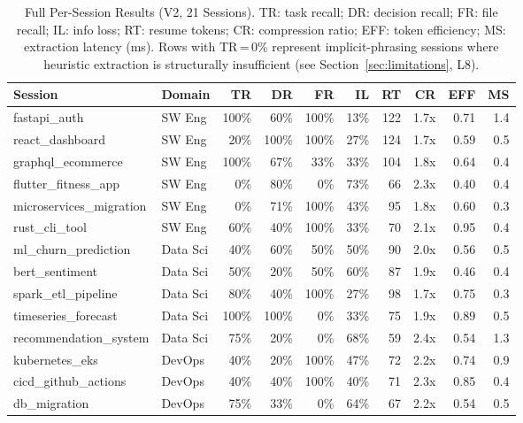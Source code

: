 \documentclass[journal]{IEEEtran}
\begin{document}
\begin{table}[t]
  \centering
  \caption{Full Per-Session Results (V2, 21 Sessions).
  TR: task recall; DR: decision recall; FR: file recall;
  IL: info loss; RT: resume tokens; CR: compression ratio;
  EFF: token efficiency; MS: extraction latency (ms).
  Rows with TR\,=\,0\% represent implicit-phrasing sessions
  where heuristic extraction is structurally insufficient
  (see Section~\ref{sec:limitations}, L8).}
  \label{tab:full_results}
  \renewcommand{\arraystretch}{1.2}
  \begin{tabular}{@{}p{3.9cm}p{2.2cm}rrrrrrrr@{}}
    \toprule
    \textbf{Session} & \textbf{Domain} &
    \textbf{TR} & \textbf{DR} & \textbf{FR} & \textbf{IL} &
    \textbf{RT} & \textbf{CR} & \textbf{EFF} & \textbf{MS} \\
    \midrule
    fastapi\_auth             & SW Eng   &100\%& 60\%&100\%& 13\%& 122&1.7x&0.71& 1.4 \\
    react\_dashboard          & SW Eng   & 20\%&100\%&100\%& 27\%& 124&1.7x&0.59& 0.5 \\
    graphql\_ecommerce        & SW Eng   &100\%& 67\%& 33\%& 33\%& 104&1.8x&0.64& 0.4 \\
    flutter\_fitness\_app     & SW Eng   &  0\%& 80\%&  0\%& 73\%&  66&2.3x&0.40& 0.4 \\
    microservices\_migration  & SW Eng   &  0\%& 71\%&100\%& 43\%&  95&1.8x&0.60& 0.3 \\
    rust\_cli\_tool           & SW Eng   & 60\%& 40\%&100\%& 33\%&  70&2.1x&0.95& 0.4 \\
    \midrule
    ml\_churn\_prediction     & Data Sci & 40\%& 60\%& 50\%& 50\%&  90&2.0x&0.56& 0.5 \\
    bert\_sentiment           & Data Sci & 50\%& 20\%& 50\%& 60\%&  87&1.9x&0.46& 0.4 \\
    spark\_etl\_pipeline      & Data Sci & 80\%& 40\%&100\%& 27\%&  98&1.7x&0.75& 0.3 \\
    timeseries\_forecast      & Data Sci &100\%&100\%&  0\%& 33\%&  75&1.9x&0.89& 0.5 \\
    recommendation\_system    & Data Sci & 75\%& 20\%&  0\%& 68\%&  59&2.4x&0.54& 1.3 \\
    \midrule
    kubernetes\_eks           & DevOps   & 40\%& 20\%&100\%& 47\%&  72&2.2x&0.74& 0.9 \\
    cicd\_github\_actions     & DevOps   & 40\%& 40\%&100\%& 40\%&  71&2.3x&0.85& 0.4 \\
    db\_migration             & DevOps   & 75\%& 33\%&  0\%& 64\%&  67&2.2x&0.54& 0.5 \\

\end{tabular}
\end{table}
\end{document}
